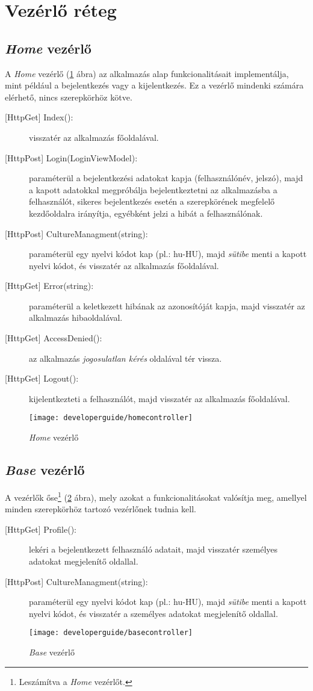 \section{Vezérlő réteg}
\label{sec:controller}
\subsection{\emph{Home} vezérlő}
A \emph{Home} vezérlő (\ref{fig:homecontroller} ábra) az alkalmazás alap funkcionalitásait implementálja, mint például a bejelentkezés vagy a kijelentkezés. Ez a vezérlő mindenki számára elérhető, nincs szerepkörhöz kötve.
\begin{description}
	\item[{[HttpGet]} Index():] visszatér az alkalmazás főoldalával.
	\item[{[HttpPost]} Login(LoginViewModel):] paraméterül a bejelentkezési adatokat kapja (felhasználónév, jelszó), majd a kapott adatokkal megpróbálja bejelentkeztetni az alkalmazásba a felhasználót, sikeres bejelentkezés esetén a szerepkörének megfelelő kezdőoldalra irányítja, egyébként jelzi a hibát a felhasználónak.
	\item[{[HttpPost]} CultureManagment(string):] paraméterül egy nyelvi kódot kap (pl.: hu-HU), majd \emph{sütibe} menti a kapott nyelvi kódot, és visszatér az alkalmazás főoldalával. 
	\item[{[HttpGet]} Error(string):] paraméterül a keletkezett hibának az azonosítóját kapja, majd visszatér az alkalmazás hibaoldalával.
	\item[{[HttpGet]} AccessDenied():] az alkalmazás \emph{jogosulatlan kérés} oldalával tér vissza.
	\item[{[HttpGet]} Logout():] kijelentkezteti a felhasználót, majd visszatér az alkalmazás főoldalával.
\end{description}
\begin{figure}[H]
	\centering
	\texttt{[image: developerguide/homecontroller]}
	\caption{\emph{Home} vezérlő}
	\label{fig:homecontroller}
\end{figure}
\subsection{\emph{Base} vezérlő}
A vezérlők őse\footnote{Leszámítva a \emph{Home} vezérlőt.} (\ref{fig:basecontroller} ábra), mely azokat a funkcionalitásokat valósítja meg, amellyel minden szerepkörhöz tartozó vezérlőnek tudnia kell.
\begin{description}
	\item[{[HttpGet]} Profile():] lekéri a bejelentkezett felhasználó adatait, majd visszatér személyes adatokat megjelenítő oldallal.
	\item[{[HttpPost]} CultureManagment(string):] paraméterül egy nyelvi kódot kap (pl.: hu-HU), majd \emph{sütibe} menti a kapott nyelvi kódot, és visszatér a személyes adatokat megjelenítő oldallal. 
\end{description}
\begin{figure}[H]
	\centering
	\texttt{[image: developerguide/basecontroller]}
	\caption{\emph{Base} vezérlő}
	\label{fig:basecontroller}
\end{figure}
